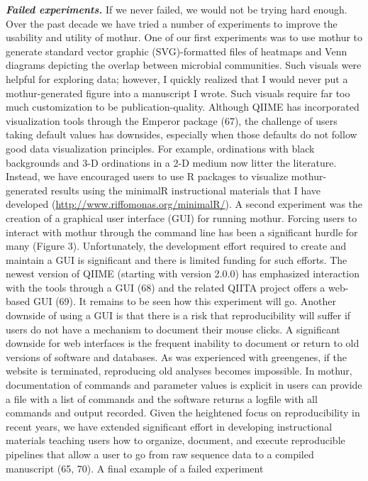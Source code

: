 \documentclass[11pt,]{article}
\begin{document}
\textbf{\emph{Failed experiments.}} If we never failed, we would not be
trying hard enough. Over the past decade we have tried a number of
experiments to improve the usability and utility of mothur. One of our
first experiments was to use mothur to generate standard vector graphic
(SVG)-formatted files of heatmaps and Venn diagrams depicting the
overlap between microbial communities. Such visuals were helpful for
exploring data; however, I quickly realized that I would never put a
mothur-generated figure into a manuscript I wrote. Such visuals require
far too much customization to be publication-quality. Although QIIME has
incorporated visualization tools through the Emperor package (67), the
challenge of users taking default values has downsides, especially when
those defaults do not follow good data visualization principles. For
example, ordinations with black backgrounds and 3-D ordinations in a 2-D
medium now litter the literature. Instead, we have encouraged users to
use R packages to visualize mothur-generated results using the minimalR
instructional materials that I have developed
(\url{http://www.riffomonas.org/minimalR/}). A second experiment was the
creation of a graphical user interface (GUI) for running mothur. Forcing
users to interact with mothur through the command line has been a
significant hurdle for many (Figure 3). Unfortunately, the development
effort required to create and maintain a GUI is significant and there is
limited funding for such efforts. The newest version of QIIME (starting
with version 2.0.0) has emphasized interaction with the tools through a
GUI (68) and the related QIITA project offers a web-based GUI (69). It
remains to be seen how this experiment will go. Another downside of
using a GUI is that there is a risk that reproducibility will suffer if
users do not have a mechanism to document their mouse clicks. A
significant downside for web interfaces is the frequent inability to
document or return to old versions of software and databases. As was
experienced with greengenes, if the website is terminated, reproducing
old analyses becomes impossible. In mothur, documentation of commands
and parameter values is explicit in users can provide a file with a list
of commands and the software returns a logfile with all commands and
output recorded. Given the heightened focus on reproducibility in recent
years, we have extended significant effort in developing instructional
materials teaching users how to organize, document, and execute
reproducible pipelines that allow a user to go from raw sequence data to
a compiled manuscript (65, 70). A final example of a failed experiment
\end{document}
